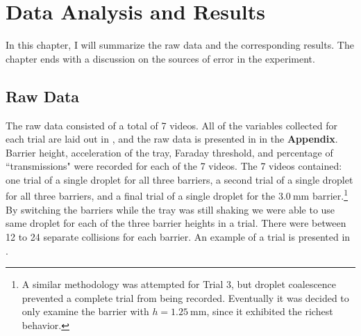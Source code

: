 \chapter{Data Analysis and Results}

In this chapter, I will summarize the raw data and the corresponding results. The chapter ends with a discussion on the sources of error in the experiment.

\section{Raw Data}



The raw data consisted of a total of 7 videos. All of the variables collected for each trial are laid out in , and the raw data is presented in  in the \textbf{Appendix}. Barrier height, acceleration of the tray, Faraday threshold, and percentage of ``transmissions" were recorded for each of the 7 videos. The 7 videos contained: one trial of a single droplet for all three barriers, a second trial of a single droplet for all three barriers, and a final trial of a single droplet for the $3.0~\mathrm{mm}$ barrier.\footnote{A similar methodology was attempted for Trial 3, but droplet coalescence prevented a complete trial from being recorded. Eventually it was decided to only examine the barrier with $h=1.25~\mathrm{mm}$, since it exhibited the richest behavior.} By switching the barriers while the tray was still shaking we were able to use same droplet for each of the three barrier heights in a trial. There were between 12 to 24 separate collisions for each barrier. An example of a trial is presented in .


